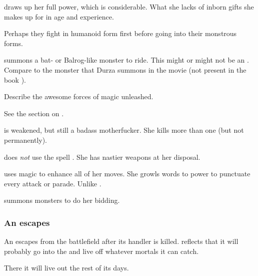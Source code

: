 \Achsah{} draws up her full power, which is considerable. 
What she lacks of inborn gifts she makes up for in age and experience. 


Perhaps they fight in humanoid form first before going into their monstrous forms. 

\Achsah{} summons a bat- or Balrog-like monster to ride. 
This might or might not be an . 
Compare to the monster that Durza summons in the movie \cite{Movie:Eragon} (not present in the book \cite{ChristopherPaolini:Eragon}). 

Describe the awesome forces of magic unleashed.

See the section on .

\Nzessuacrith{} is weakened, but still a badass motherfucker. 
She kills more than one \resphan{} (but not permanently). 

\Nzessuacrith{} does \emph{not} use the spell . 
She has nastier weapons at her disposal. 

\Nzessuacrith{} uses magic to enhance all of her moves. 
She growls words to power to punctuate every attack or parade. 
Unlike \Ishnaruchaefir. 

\Nzessuacrith summons monsters to do her bidding.






\subsubsection{An \umbra escapes}
An \umbra{} escapes from the battlefield after its handler is killed. 
\Achsah{} reflects that it will probably go into the \Wylde{} and live off whatever mortals it can catch. 

There it will live out the rest of its days. 

